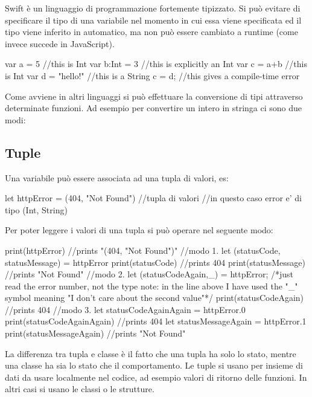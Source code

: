 Swift è un linguaggio di programmazione fortemente tipizzato. 
Si può evitare di specificare il tipo di una variabile nel momento in cui essa viene specificata ed il tipo viene inferito in automatico, ma non può essere cambiato a runtime (come invece succede in JavaScript).
\begin{Swift}
    var a = 5 //this is Int
    var b:Int = 3 //this is explicitly an Int
    var c = a+b //this is Int
    var d = "hello!" //this is a String
    c = d; //this gives a compile-time error
\end{Swift}

Come avviene in altri linguaggi si può effettuare la conversione di tipi attraverso determinate funzioni.
Ad esempio per convertire un intero in stringa ci sono due modi:

\subsection{Tuple}
Una variabile può essere associata ad una tupla di valori, es:
\begin{Swift}
    let httpError = (404, "Not Found") //tupla di valori
    //in questo caso error e' di tipo (Int, String)
\end{Swift}
Per poter leggere i valori di una tupla si può operare nel seguente modo:
\begin{Swift}
    print(httpError) //prints "(404, "Not Found")"
    //modo 1.
    let (statusCode, statusMessage) = httpError
    print(statusCode) //prints 404
    print(statusMessage) //prints "Not Found"
    //modo 2.
    let (statusCodeAgain,_) = httpError; /*just read the 
    error number, not the type
    note: in the line above I have used the "_" symbol 
    meaning "I don't care about the second value"*/
    print(statusCodeAgain) //prints 404
    //modo 3.
    let statusCodeAgainAgain = httpError.0
    print(statusCodeAgainAgain) //prints 404
    let statusMessageAgain = httpError.1
    print(statusMessageAgain) //prints "Not Found"
\end{Swift} 

La differenza tra tupla e classe è il fatto che una tupla ha solo lo stato, mentre una classe ha sia lo stato che il comportamento. 
Le tuple si usano per insieme di dati da usare localmente nel codice, ad esempio valori di ritorno delle funzioni. In altri casi si usano le classi o le strutture.

